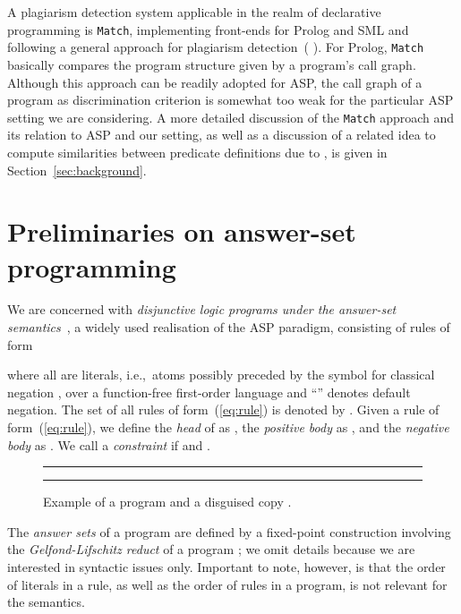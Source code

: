 \documentclass{tlp}
\newcommand{\iec}[0]{i.e.,\ }
\begin{document}
A plagiarism detection system applicable in the realm of declarative programming is \texttt{Match}, implementing front-ends for Prolog and SML and following a general approach for plagiarism detection~( ). 
For Prolog, \texttt{Match} basically compares the  program structure given by a  program's call graph.
Although this approach can be readily adopted for ASP, the call graph of a program as discrimination criterion is somewhat too weak for the particular ASP setting we are considering.
A more detailed discussion of the {\tt Match} approach and its relation to ASP and our setting, as well as a discussion of a related idea to
compute similarities between predicate definitions due to , is given in Section~\ref{sec:background}.

\section{Preliminaries on answer-set programming}\label{sec:prel}


We are concerned with \emph{disjunctive logic programs under the answer-set semantics}~\cite{gelf-lifs-91}, a widely used realisation of the ASP paradigm, consisting of 
rules of form

where all  are literals, 
\iec atoms possibly preceded by the symbol for classical negation ,
over a function-free first-order language
and ``'' denotes default negation.
The set of all rules of form~(\ref{eq:rule}) is denoted by .
Given a rule  of form~(\ref{eq:rule}), we define the \emph{head} of  as
, the \emph{positive body} as , and the \emph{negative body} as .
We call  a \emph{constraint} if  and .

\begin{figure}
\hrule
\medskip
\begin{center}

\medskip
\hrule
\caption{Example of a program  and a  disguised copy .}\label{fig:example}
\end{center}
\end{figure}


The \emph{answer sets} of a program are defined by a fixed-point construction involving the \emph{Gelfond-Lifschitz reduct} of a program \cite{gelf-lifs-91}; we omit details because we are interested in syntactic issues only.
Important to note, however, is that the order of literals in a rule, as well as the order of rules in a program, is not relevant for the semantics. 
\end{document}
